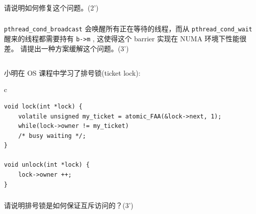 \documentclass[a4paper,12pt]{article}
\newcommand{\score}[1]{(#1')}
\begin{document}
\subsubsection{}

请说明如何修复这个问题。\score{2}

\begin{answer}
  \lipsum[3]
\end{answer}

\subsubsection{}

\verb|pthread_cond_broadcast| 会唤醒所有正在等待的线程，而从 \verb|pthread_cond_wait| 醒来的线程都需要持有 \verb|b->m| , 这使得这个 barrier 实现在 NUMA 环境下性能很差。
请提出一种方案缓解这个问题。\score{3}

\begin{answer}
  \lipsum[3]
\end{answer}

\subsection{}

小明在 OS 课程中学习了排号锁(ticket lock):

\begin{table}[htb]
  \centering
  \begin{tabular}{c}
    \begin{lstlisting}
void lock(int *lock) {
    volatile unsigned my_ticket = atomic_FAA(&lock->next, 1);
    while(lock->owner != my_ticket)
	/* busy waiting */;
}

void unlock(int *lock) {
    lock->owner ++;
}
    \end{lstlisting}
  \end{tabular}
\end{table}

\subsubsection{}

请说明排号锁是如何保证互斥访问的？\score{3}

\begin{answer}
  \lipsum[3]
\end{answer}

\subsubsection{}
\end{document}
